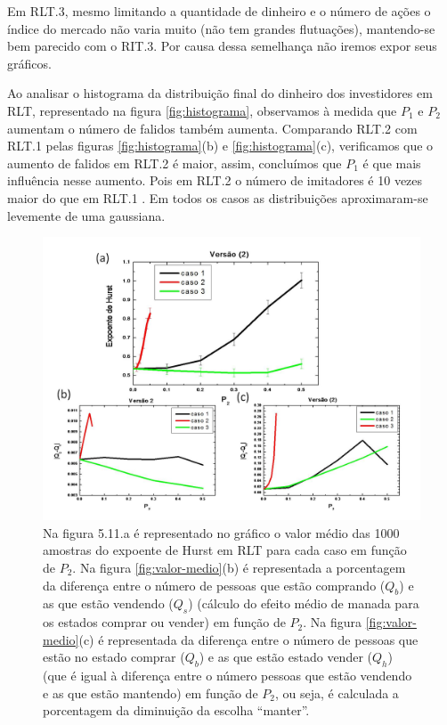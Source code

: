 \documentclass[brazil,ruledheader]{abnt}
\begin{document}
Em RLT.3, mesmo limitando a quantidade de dinheiro e o número de ações o
índice do mercado não varia muito (não tem grandes flutuações), mantendo-se bem
parecido com o RIT.3. Por causa dessa semelhança não iremos expor seus gráficos.


Ao analisar o histograma da distribuição final do dinheiro dos investidores em
RLT, representado na figura \ref{fig:histograma},
observamos à medida que $P_1$ e $P_2$ aumentam o número de falidos também
aumenta. Comparando RLT.2 com RLT.1 pelas figuras \ref{fig:histograma}(b) e
\ref{fig:histograma}(c), verificamos que o aumento de falidos em RLT.2 é maior,
assim, concluímos que $P_1$ é que mais influência nesse aumento. Pois em RLT.2 
o número de imitadores é 10 vezes maior do que em RLT.1 . Em todos os casos as
distribuições aproximaram-se levemente de uma gaussiana.  


\begin{figure}[!h]
\centering
\includegraphics[width=0.8\linewidth]{Figuras/17.jpg}
\caption[Análise do expoente de Hurst em RLT]{Na figura 5.11.a é representado no
gráfico o valor médio das 1000 amostras do expoente de Hurst em RLT para cada
caso em função de $P_2$.
Na figura \ref{fig:valor-medio}(b) é representada a porcentagem da diferença
entre o número de pessoas que estão comprando ($Q_b$) e as que estão vendendo
($Q_s$) (cálculo do efeito médio de manada para os estados comprar ou vender)
em função de $P_2$. Na figura \ref{fig:valor-medio}(c) é representada da
diferença entre o número de pessoas que estão no estado comprar ($Q_b$) e as que
estão estado vender ($Q_h$) (que é igual à diferença entre o número pessoas que
estão vendendo e as que estão mantendo) em função de $P_2$, ou seja, é calculada
a porcentagem da diminuição da escolha ``manter''.}
\label{fig:grafico2}
\end{figure}
\end{document}

